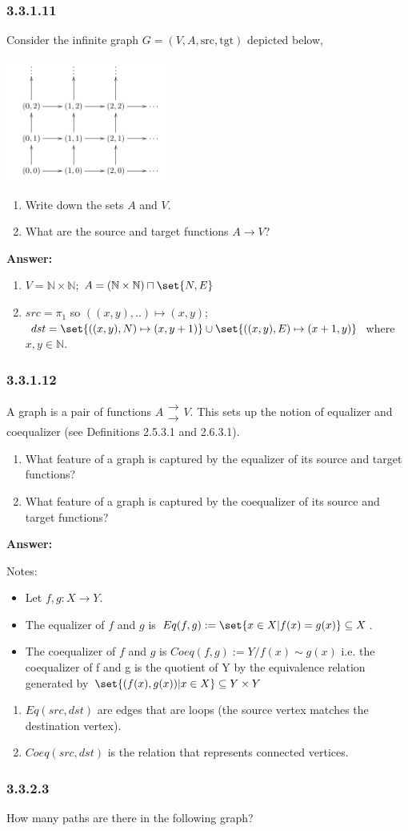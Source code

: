 \documentclass{article}
\newcommand{\N}{\mathbb{N}}
\newcommand{\vsp}[0]{\vspace*{10pt}\par}
\newcommand{\exercise}[1]{\subsubsection*{#1}}
\newcommand{\ans}[0]{\vsp\textbf{Answer: }\vsp}
\newcommand{\toto}[0]{\begin{array}{c}\rightarrow \\[-1.9ex]\rightarrow\end{array}}
\newcommand{\ei}{\item}
\newcommand{\es}{\begin{enumerate}[label=(\alph*)]\ei}
\newcommand{\ee}{\end{enumerate}}
\newcommand{\ls}{\begin{itemize}\item}
\newcommand{\li}{\item}
\renewcommand{\le}{\end{itemize}}
\begin{document}
\exercise{3.3.1.11}

Consider the infinite graph $G = (V, A, \text{src}, \text{tgt})$ depicted below,

\begin{center}
\includegraphics[width=0.4\textwidth]{img/ex33111.png}
\end{center}

\es Write down the sets $A$ and $V$.
\ei What are the source and target functions $A \to V$?
\ee

\ans

\es $V = \N \times \N$; $A = (\N \times \N) \sqcap \set{N,E}$
\ei $src = \pi_1$ so $((x,y),..) \mapsto (x,y)$;
    $dst = \set{ ((x,y),N) \mapsto (x,y+1)} \cup \set{ ((x,y),E) \mapsto
    (x+1,y)}$ where $x,y \in \N$.
\ee

\exercise{3.3.1.12}

A graph is a pair of functions $A \toto V$. This sets up the notion of
equalizer and coequalizer (see Definitions 2.5.3.1 and 2.6.3.1).

\es What feature of a graph is captured by the equalizer of its source and
    target functions?
\ei What feature of a graph is captured by the coequalizer of its source and
    target functions?
\ee


\ans

Notes:

\ls Let $f,g: X \to Y$.

\li The equalizer of $f$ and $g$ is $Eq(f,g) := \set{x \in X | f(x) = g(x)}
    \subseteq X$.

\li The coequalizer of $f$ and $g$ is $Coeq(f,g) := Y / f(x) \sim
    g(x)$ i.e.  the coequalizer of f and g is the quotient of Y by the
    equivalence relation generated by $\set{(f(x),g(x)) | x \in X} \subseteq Y
    \times Y$
\le

\es $Eq(src,dst)$ are edges that are loops (the source vertex matches the
    destination vertex).
\ei $Coeq(src,dst)$ is the relation that represents connected vertices.
\ee

\exercise{3.3.2.3}

How many paths are there in the following graph?
\end{document}
